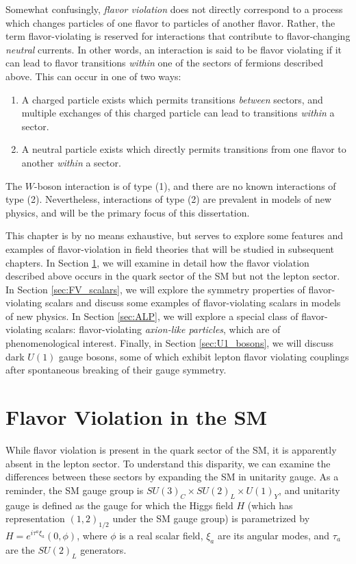 Somewhat confusingly, {\it flavor violation} does not directly correspond to a process which changes particles of one flavor to particles of another flavor. Rather, the term flavor-violating is reserved for interactions that contribute to flavor-changing {\it neutral} currents. In other words, an interaction is said to be  flavor violating if it can lead to flavor transitions {\it within} one of the sectors of fermions described above. This can occur in one of two ways:
\begin{enumerate}
    \item A charged particle exists which permits transitions {\it between} sectors, and multiple exchanges of this charged particle can lead to transitions {\it within} a sector.
    \item A neutral particle exists which directly permits transitions from one flavor to another {\it within} a sector.
\end{enumerate}
The $W$-boson interaction is of type (1), and there are no known interactions of type (2). Nevertheless, interactions of type (2) are prevalent in models of new physics, and will be the primary focus of this dissertation.


This chapter is by no means exhaustive, but serves to explore some features and examples of flavor-violation in field theories that will be studied in subsequent chapters. In Section \ref{sec:SM_FV}, we will examine in detail how the flavor violation described above occurs in the quark sector of the SM but not the lepton sector. In Section \ref{sec:FV_scalars}, we will explore the symmetry properties of flavor-violating scalars and discuss some examples of flavor-violating scalars in models of new physics. In Section \ref{sec:ALP}, we will explore a special class of flavor-violating scalars: flavor-violating {\it axion-like particles}, which are of phenomenological interest. Finally,  in Section \ref{sec:U1_bosons}, we will discuss dark $U(1)$ gauge bosons, some of which exhibit lepton flavor violating couplings after spontaneous breaking of their gauge symmetry. 

\section{Flavor Violation in the SM}\label{sec:SM_FV}
While flavor violation is present in the quark sector of the SM, it is apparently absent in the lepton sector. To understand this disparity, we can examine the differences between these sectors by expanding the SM in unitarity gauge. As a reminder, the SM gauge group is $SU(3)_C \times SU(2)_L \times U(1)_Y$, and unitarity gauge is defined as the gauge for which the Higgs field $H$ (which has representation $(1, 2)_{1/2}$ under the SM gauge group) is parametrized by $H = e^{i\tau^a\xi_a}(0, \phi)$, where $\phi$ is a real scalar field, $\xi_a$ are its angular modes, and $\tau_a$ are the $SU(2)_L$ generators.

